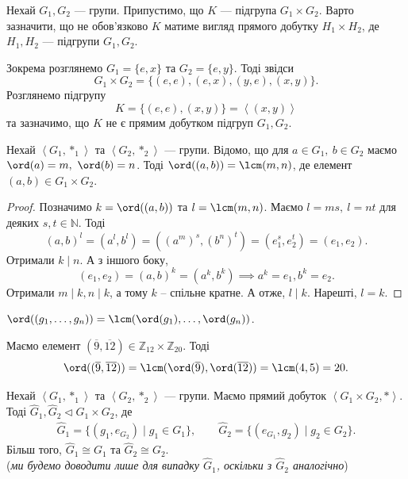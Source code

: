 \documentclass{math_library}
\begin{document}
\begin{remark}
Нехай $G_1,G_2$ --- групи. Припустимо, що $K$ --- підгрупа $G_1 \times G_2$. Варто зазначити, що не обов'язково $K$ матиме вигляд прямого добутку $H_1 \times H_2$, де $H_1,H_2$ --- підгрупи $G_1,G_2$. 
\end{remark}

\begin{example}
Зокрема розглянемо $G_1 = \{e,x\}$ та $G_2 = \{e,y\}$. Тоді звідси 
\[
G_1 \times G_2 = \{ (e,e), (e,x), (y,e), (x,y) \}.
\]
Розглянемо підгрупу \[
K = \{ (e,e), (x,y)\} = \left< (x,y) \right> \] та зазначимо, що $K$ не є прямим добутком підгруп $G_1,G_2$.
\end{example}

\begin{proposition}
Нехай $\left<G_1, *_1 \right>$ та $\left<G_2, *_2 \right>$ --- групи. Відомо, що для $a \in G_1,\ b \in G_2$ маємо $\ord(a) = m,\ \ord(b) = n$. Тоді $\ord((a,b)) = \lcm(m,n)$, де елемент $(a,b) \in G_1 \times G_2$.
\end{proposition}

\begin{proof}
Позначимо $k = \ord((a,b))$ та $l = \lcm(m,n)$. Маємо $l = ms,\ l = nt$ для деяких $s,t \in \mathbb{N}$. Тоді
\[
(a,b)^l = (a^l,b^l) = ((a^m)^s, (b^n)^t) = (e_1^s, e_2^t) = (e_1,e_2).\] 
Отримали $k \mid n$. А з іншого боку, 
\[(e_1,e_2) = (a,b)^k = (a^k,b^k) \implies a^k = e_1, b^k = e_2.
\]
Отримали $m \mid k, n \mid k$, а тому $k$ -- спільне кратне. А отже, $l \mid k$. Нарешті, $l = k$.
\end{proof}

\begin{corollary}
$\ord((g_1,\dots,g_n)) = \lcm(\ord(g_1), \dots, \ord(g_n))$.
\end{corollary}

\begin{example}
Маємо елемент $(\overline{9},\overline{12}) \in \mathbb{Z}_{12} \times \mathbb{Z}_{20}$. Тоді \[
\ord((\overline{9},\overline{12})) = \lcm(\ord(\overline{9}),\ord(\overline{12})) = \lcm(4,5) = 20.
\]
\end{example}

\begin{theorem}
Нехай $\left< G_1, *_1 \right>$ та $\left< G_2, *_2 \right>$ --- групи. Маємо прямий добуток $\left< G_1 \times G_2, * \right>$. Тоді $\hat{G}_1, \hat{G}_2 \triangleleft G_1 \times G_2$, де
\begin{align*}
\hat{G}_1 = \{ (g_1, e_{G_2}) \mid g_1 \in G_1 \}, \qquad \hat{G}_2 = \{ (e_{G_1}, g_2) \mid g_2 \in G_2 \}.
\end{align*}
Більш того, $\hat{G}_1 \cong G_1$ та $\hat{G}_2 \cong G_2$.\\
(\textit{ми будемо доводити лише для випадку $\hat{G}_1$, оскільки з $\hat{G}_2$ аналогічно})
\end{theorem}
\end{document}
